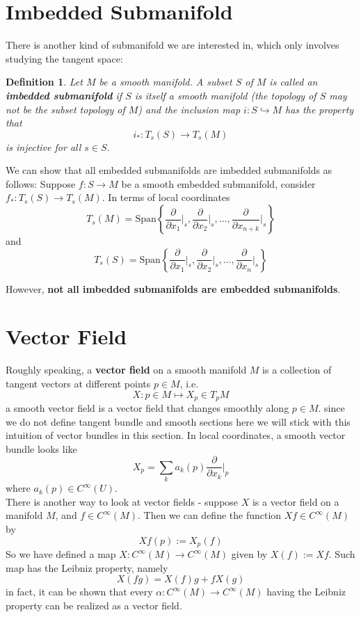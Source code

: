 \documentclass[11pt]{book}
\newtheorem{definition}[theorem]{Definition}
\begin{document}
\section{Imbedded Submanifold}
There is another kind of submanifold we are interested in, which only involves studying the tangent space:
\begin{definition}
Let $M$ be a smooth manifold. A subset $S$ of $M$ is called an \textbf{imbedded submanifold} if $S$ is itself a smooth manifold (the topology of $S$ may not be the subset topology of $M$) and the inclusion map $i: S \hookrightarrow M$ has the property that
$$i_* : T_s(S) \to T_s(M)$$
is injective for all $s \in S$.
\end{definition}
We can show that all embedded submanifolds are imbedded submanifolds as follows: Suppose $f: S \to M$ be a smooth embedded submanifold, consider $f_*: T_s(S) \to T_s(M)$. In terms of local coordinates
$$T_s(M) = \mathrm{Span}\left\{ \frac{\partial}{\partial x_1}  \Big|_s, \frac{\partial}{\partial x_2}  \Big|_s, \dots, \frac{\partial}{\partial x_{n+k}}  \Big|_s\right\}$$
and
$$T_s(S) = \mathrm{Span}\left\{ \frac{\partial}{\partial x_1}  \Big|_s, \frac{\partial}{\partial x_2}  \Big|_s, \dots, \frac{\partial}{\partial x_{n}}  \Big|_s\right\}$$

However, \textbf{not all imbedded submanifolds are embedded submanifolds}.

\section{Vector Field}
Roughly speaking, a \textbf{vector field} on a smooth manifold $M$ is a collection of tangent vectors at different points $p \in M$, i.e.
$$X: p \in M \mapsto X_p \in T_pM$$
a smooth vector field is a vector field that changes smoothly along $p \in M$. since we do not define tangent bundle and smooth sections here we will stick with this intuition of vector bundles in this section. In local coordinates, a smooth vector bundle looks like
$$X_p = \sum_k a_k(p) \frac{\partial}{\partial x_k}  \Big|_p$$
where $a_k(p) \in C^{\infty}(U)$.\\
There is another way to look at vector fields - suppose $X$ is a vector field on a manifold $M$, and $f \in C^{\infty}(M)$. Then we can define the function $Xf \in C^{\infty}(M)$ by
$$Xf(p) := X_p(f)$$
So we have defined a map $X : C^{\infty}(M) \to C^{\infty}(M)$ given by $X(f) := Xf$. Such map has the Leibniz property, namely
$$X(fg) = X(f)g + fX(g)$$
in fact, it can be shown that every $\alpha: C^{\infty}(M) \to C^{\infty}(M)$ having the Leibniz property can be realized as a vector field.
\end{document}
